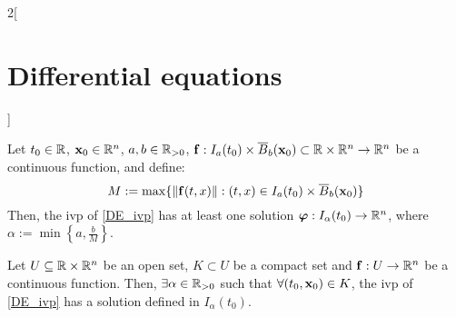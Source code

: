 \documentclass[../../../main.tex]{subfiles}
\begin{document}
\begin{multicols}{2}[\section{Differential equations}]
\begin{corollary}
  \end{corollary}
  \begin{theorem}
    Let $t_0\in\mathbb{R}$, $\boldsymbol{\mathrm{x}}_0\in\mathbb{R}^n$, $a,b\in\mathbb{R}_{>0}$, $\boldsymbol{\mathrm{f}}:I_a(t_0)\times\overline{B}_{b}(\boldsymbol{\mathrm{x}}_0)\subset\mathbb{R}\times\mathbb{R}^n\rightarrow\mathbb{R}^n$ be a continuous function, and define: $$M:=\max\{\|\boldsymbol{\mathrm{f}}(t,x)\|:(t,x)\in I_a(t_0)\times\overline{B}_{b}(\boldsymbol{\mathrm{x}}_0)\}$$ Then, the ivp of \cref{DE_ivp} has at least one solution $\boldsymbol{\mathrm{\varphi}}:I_\alpha(t_0)\rightarrow\mathbb{R}^n$, where $\alpha:=\min\left\{a,\frac{b}{M}\right\}$.
  \end{theorem}
  \begin{corollary}
    Let $U\subseteq\mathbb{R}\times\mathbb{R}^n$ be an open set, $K\subset U$ be a compact set and $\boldsymbol{\mathrm{f}}:U\rightarrow\mathbb{R}^n$ be a continuous function. Then, $\exists\alpha\in\mathbb{R}_{>0}$ such that $\forall (t_0,\boldsymbol{\mathrm{x}}_0)\in K$, the ivp of \cref{DE_ivp} has a solution defined in $I_\alpha(t_0)$.
  \end{corollary}

\end{multicols}
\end{document}
